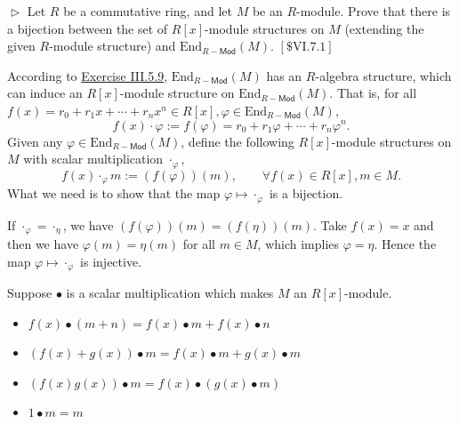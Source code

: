 \documentclass[12pt,letterpaper,boxed]{hmcpset}
\begin{document}
\begin{problem}[5.11]
	$\vartriangleright$ Let $R$ be a commutative ring, and let $M$ be an $R$-module. Prove that there is a bijection between the set of $R[x]$-module structures on $M$ (extending the given $R$-module structure) and $\mathrm{End}_{R-\mathsf{Mod}}(M)$. $[\$ \mathrm{VI} .7 .1]$
\end{problem}
\begin{solution}	
	According to \hyperlink{Exercise III.5.9}{Exercise III.5.9}, $\mathrm{End}_{R-\mathsf{Mod}}(M)$ has an $R$-algebra structure, which can induce an $R[x]$-module structure on $\mathrm{End}_{R-\mathsf{Mod}}(M)$. That is, for all $f(x)=r_0+r_1x+\cdots+ r_nx^n\in R[x],\varphi\in \mathrm{End}_{R-\mathsf{Mod}}(M)$,
	\[
	f(x)\cdot \varphi:=f(\varphi)=r_0+r_1\varphi+\cdots+ r_n\varphi^n.
	\] 
	Given any $\varphi\in\mathrm{End}_{R-\mathsf{Mod}}(M)$, define the following $R[x]$-module structures on $M$ with scalar multiplication $\cdot_\varphi$,
	\[
	f(x)\cdot_\varphi m:=(f(\varphi))(m), \qquad\forall f(x)\in R[x],m\in M.
	\]
	What we need is to show that the map $\varphi\mapsto\cdot_\varphi$ is a bijection.
	

	If $\cdot_\varphi=\cdot_\eta$, we have $(f(\varphi))(m)=(f(\eta))(m)$. Take $f(x)=x$ and then we have $\varphi(m)=\eta(m)$ for all $m\in M$, which implies $\varphi=\eta$. Hence the map $\varphi\mapsto\cdot_\varphi$ is injective.
	
	Suppose $\bullet$ is a scalar multiplication which makes $M$ an $R[x]$-module.
	\begin{itemize}
		\item $f(x)\bullet (m+n)=f(x)\bullet m+f(x)\bullet n$
		\item $(f(x)+g(x))\bullet m=f(x)\bullet m+g(x)\bullet m$
		\item $(f(x) g(x))\bullet m=f(x)\bullet(g(x)\bullet m)$
		\item $1\bullet m=m$
	\end{itemize}
	
	
\end{solution}
\end{document}

